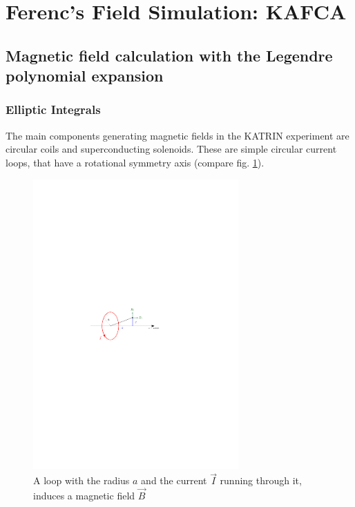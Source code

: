 \section{Ferenc's Field Simulation: KAFCA}\label{sec:KAFCA}
\subsection{Magnetic field calculation with the Legendre polynomial expansion}
	\subsubsection{Elliptic Integrals}
	  The main components generating magnetic fields in the KATRIN experiment are circular coils and superconducting solenoids. These are simple circular current loops, that have a rotational symmetry axis (compare fig. \ref{fig:current loop}). 
	  \begin{figure}[h]
		\centering \includegraphics[width=0.7\textwidth]{images/KAFCAFigures/current_loop.pdf}
		\caption{A loop with the radius $a$ and the current $\vec{I}$ running through it, induces a magnetic field $\vec{B}$}
		\label{fig:current loop}
	  \end{figure}\\
